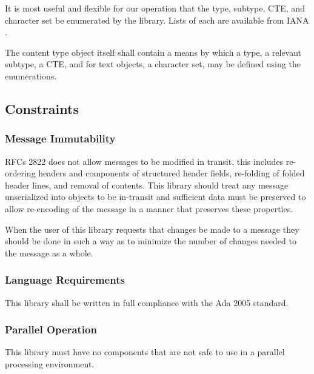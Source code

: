 \documentclass[11pt]{article}
\begin{document}
It is most useful and flexible for our operation that the type,
subtype, CTE, and character set be enumerated by the library. Lists of
each are available from IANA . 

The content type object itself shall contain a means by which a type,
a relevant subtype, a CTE, and for text objects, a character set, may
be defined using the enumerations.


\subsection{Constraints}
\label{constraints}

\subsubsection{Message Immutability}

RFCs 2822 does not allow messages to be modified in transit, this
includes re-ordering headers and components of structured header
fields, re-folding of folded header lines, and removal of
contents. This library should treat any message unserialized into
objects to be in-transit and sufficient data must be preserved to
allow re-encoding of the message in a manner that preserves these
properties.

When the user of this library requests that changes be made to a
message they should be done in such a way as to minimize the number of
changes needed to the message as a whole.

\subsubsection{Language Requirements}

This library shall be written in full compliance with the Ada 2005
standard.

\subsubsection{Parallel Operation}

This library must have no components that are not safe to use in a
parallel processing environment.
\end{document}
